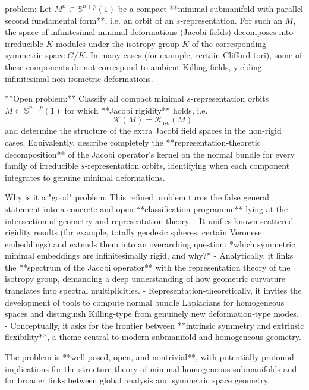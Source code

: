 problem:  
Let \(M^n \subset \mathbb{S}^{n+p}(1)\) be a compact **minimal submanifold with parallel second fundamental form**, i.e. an orbit of an \(s\)‑representation. For such an \(M\), the space of infinitesimal minimal deformations (Jacobi fields) decomposes into irreducible \(K\)‑modules under the isotropy group \(K\) of the corresponding symmetric space \(G/K\). In many cases (for example, certain Clifford tori), some of these components do not correspond to ambient Killing fields, yielding infinitesimal non‑isometric deformations.

**Open problem:**  
Classify all compact minimal \(s\)-representation orbits \(M \subset \mathbb{S}^{n+p}(1)\) for which **Jacobi rigidity** holds, i.e.
\[
\mathcal{K}(M) = \mathcal{K}_{\mathrm{iso}}(M),
\]
and determine the structure of the extra Jacobi field spaces in the non‑rigid cases.  
Equivalently, describe completely the **representation‑theoretic decomposition** of the Jacobi operator’s kernel on the normal bundle for every family of irreducible \(s\)-representation orbits, identifying when each component integrates to genuine minimal deformations.

Why is it a "good" problem:  
This refined problem turns the false general statement into a concrete and open **classification programme** lying at the intersection of geometry and representation theory.  
- It unifies known scattered rigidity results (for example, totally geodesic spheres, certain Veronese embeddings) and extends them into an overarching question: *which symmetric minimal embeddings are infinitesimally rigid, and why?*  
- Analytically, it links the **spectrum of the Jacobi operator** with the representation theory of the isotropy group, demanding a deep understanding of how geometric curvature translates into spectral multiplicities.  
- Representation‑theoretically, it invites the development of tools to compute normal bundle Laplacians for homogeneous spaces and distinguish Killing‑type from genuinely new deformation‑type modes.  
- Conceptually, it asks for the frontier between **intrinsic symmetry and extrinsic flexibility**, a theme central to modern submanifold and homogeneous geometry.  

The problem is **well‑posed, open, and nontrivial**, with potentially profound implications for the structure theory of minimal homogeneous submanifolds and for broader links between global analysis and symmetric space geometry.